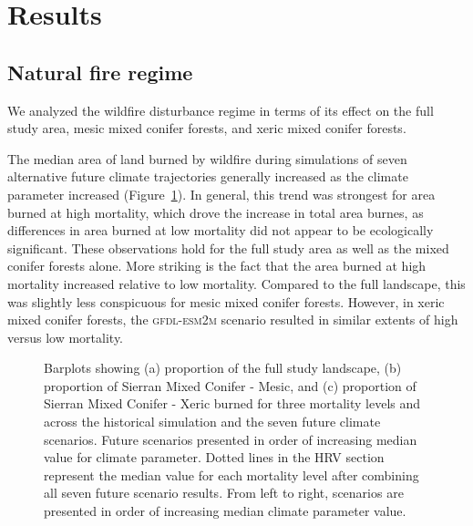 \section{Results}

\subsection*{Natural fire regime}

We analyzed the wildfire disturbance regime in terms of its effect on the full study area, mesic mixed conifer forests, and xeric mixed conifer forests.

The median area of land burned by wildfire during simulations of seven alternative future climate trajectories generally increased as the climate parameter increased (Figure~\ref{fig:dareacomp}). In general, this trend was strongest for area burned at high mortality, which drove the increase in total area burnes, as differences in area burned at low mortality did not appear to be ecologically significant. These observations hold for the full study area as well as the mixed conifer forests alone. More striking is the fact that the area burned at high mortality increased relative to low mortality. Compared to the full landscape, this was slightly less conspicuous for mesic mixed conifer forests. However, in xeric mixed conifer forests, the \textsc{gfdl-esm2m} scenario resulted in similar extents of high versus low mortality.


\begin{figure}[!htbp]
  \centering


    \caption{Barplots showing (a) proportion of the full study landscape, (b) proportion of Sierran Mixed Conifer - Mesic, and (c) proportion of Sierran Mixed Conifer - Xeric burned for three mortality levels and across the historical simulation and the seven future climate scenarios. Future scenarios presented in order of increasing median value for climate parameter. Dotted lines in the HRV section represent the median value for each mortality level after combining all seven future scenario results. From left to right, scenarios are presented in order of increasing median climate parameter value.}
  \label{fig:dareacomp}
\end{figure}

